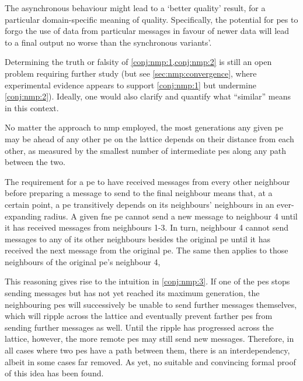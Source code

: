 \begin{conjecture}\label{conj:nmp:2}
    The asynchronous behaviour might lead to a `better quality' result, for a particular domain-specific meaning of quality.  Specifically, the potential for \glspl{pe} to forgo the use of data from particular messages in favour of newer data will lead to a final output no worse than the synchronous variants'.
\end{conjecture}

Determining the truth or falsity of \cref{conj:nmp:1,conj:nmp:2} is still an open problem requiring further study (but see \cref{sec:nmp:convergence}, where experimental evidence appears to support \cref{conj:nmp:1} but undermine \cref{conj:nmp:2}).  Ideally, one would also clarify and quantify what ``similar'' means in this context.

\begin{conjecture}\label{conj:nmp:3}
    No matter the approach to \gls{nmp} employed, the most generations any given \gls{pe} may be ahead of any other \gls{pe} on the lattice depends on their distance from each other, as measured by the smallest number of intermediate \glspl{pe} along any path between the two.
\end{conjecture}

The requirement for a \gls{pe} to have received messages from every other neighbour before preparing a message to send to the final neighbour means that, at a certain point, a \gls{pe} transitively depends on its neighbours' neighbours in an ever-expanding radius.  A given \gls{fne} \gls{pe} cannot send a new message to neighbour 4 until it has received messages from neighbours 1-3.  In turn, neighbour 4 cannot send messages to any of its other neighbours besides the original \gls{pe} until it has received the next message from the original \gls{pe}.  The same then applies to those neighbours of the original \gls{pe}'s neighbour 4, \etc{}

This reasoning gives rise to the intuition in \cref{conj:nmp:3}.  If one of the \glspl{pe} stops sending messages but has not yet reached its maximum generation, the neighbouring \glspl{pe} will successively be unable to send further messages themselves, which will ripple across the lattice and eventually prevent farther \glspl{pe} from sending further messages as well.  Until the ripple has progressed across the lattice, however, the more remote \glspl{pe} may still send new messages.  Therefore, in all cases where two \glspl{pe} have a path between them, there is an interdependency, albeit in some cases far removed.  As yet, no suitable and convincing formal proof of this idea has been found.

